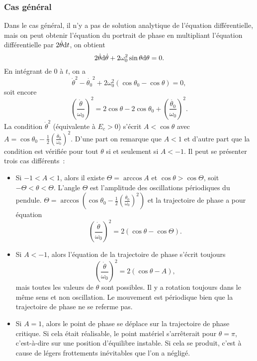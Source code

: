 \subsubsection{Cas général}%
%
Dans le cas général, il n'y a pas de solution analytique de l'équation
différentielle, mais on peut obtenir l'équation du portrait de phase en
multipliant l'équation différentielle par \(2\dot{\theta} \mathrm{d} t\), on obtient
\begin{equation}%
  2\dot{\theta} \D \dot{\theta} + 2\omega_0^2\sin\theta \D \theta=0.
\end{equation}%
En intégrant de \(0\) à \(t\), on a
\begin{equation}%
  \dot{\theta}^2-\dot{\theta_0}^2+2\omega_0^2(\cos\theta_0 - \cos\theta)=0,
\end{equation}%
soit encore
\begin{equation}%
  \left(\frac{\dot{\theta}}{\omega_0}\right)^2 = 2\cos\theta - 2\cos\theta_0 +
  \left(\frac{\dot{\theta_0}}{\omega_0}\right)^2.
\end{equation}%
%
La condition \(\dot\theta^2\) (équivalente à \(E_c>0\)) s'écrit
\(A<\cos\theta\) avec \(A=\cos\theta_0 -
\frac{1}{2}\left(\frac{\dot{\theta_0}}{\omega_0}\right)^2\). D'une part on
remarque que \(A<1\) et d'autre part que la condition est vérifiée pour tout
\(\theta\) si et seulement si \(A<-1\). Il peut se présenter trois cas
différents~:
\begin{itemize}%
\item Si \(-1 < A < 1\), alors il existe \(\Theta=\arccos A\) et
  \(\cos\theta>\cos\Theta\), soit \(-\Theta < \theta < \Theta\). L'angle
    \(\Theta\) est l'amplitude des oscillations périodiques du pendule.
    \(\Theta = \arccos\left(\cos\theta_0 -
    \frac{1}{2}\left(\frac{\dot{\theta_0}}{\omega_0}\right)^2\right)\) et la
    trajectoire de phase a pour équation
  \begin{equation}
    \left(\frac{\dot{\theta}}{\omega_0}\right)^2 = 2(\cos\theta - \cos\Theta).
  \end{equation}
\item Si \(A < -1\), alors l'équation de la trajectoire de phase s'écrit
  toujours
  \begin{equation}
    \left(\frac{\dot{\theta}}{\omega_0}\right)^2 = 2(\cos\theta - A),
  \end{equation}
  mais toutes les valeurs de \(\theta\) sont possibles. Il y a rotation
    toujours dans le même sens et non oscillation. Le mouvement est périodique
    bien que la trajectoire de phase ne se referme pas.
\item Si \(A = 1\), alors le point de phase se déplace sur la trajectoire de
  phase critique. Si cela était réalisable, le point matériel s'arrêterait pour
    \(\theta=\pi\), c'est-à-dire sur une position d'équilibre instable. Si cela
    se produit, c'est à cause de légers frottements inévitables que l'on a
    négligé.
\end{itemize}%
%
